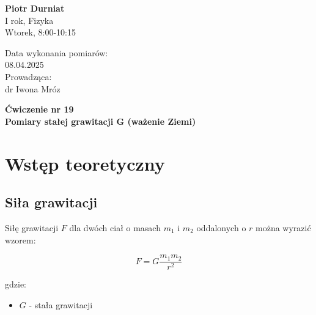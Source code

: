 \documentclass[a4paper,12pt]{article}
\begin{document}
\noindent
\begin{minipage}{0.5\textwidth}
    \raggedright
    \textbf{Piotr Durniat} \\
    I rok, Fizyka \\
    Wtorek, 8:00-10:15 \\
    \vspace{0.5cm}
    \vspace{0.5cm}
\end{minipage}%
\begin{minipage}{0.5\textwidth}
    \raggedleft
    Data wykonania pomiarów: \\
    08.04.2025 \\
    \vspace{0.5cm} %
    Prowadząca: \\
    dr Iwona Mróz
\end{minipage}

\vspace{2cm} %
\begin{center}
    \LARGE \textbf{Ćwiczenie nr 19} \\[0.5cm]
    \Large \textbf{Pomiary stałej grawitacji G (ważenie Ziemi)}
\end{center}

\vspace{1cm} %
\noindent

\tableofcontents
\newpage

\section{Wstęp teoretyczny}

\subsection*{Siła grawitacji}

Siłę grawitacji $F$ dla dwóch ciał o masach $m_1$ i $m_2$ oddalonych o $r$ można wyrazić wzorem:

\begin{equation}
    F = G \frac{m_1 m_2}{r^2}
\end{equation}

gdzie:
\begin{itemize}
    \item $G$ - stała grawitacji
\end{itemize}
\end{document}
